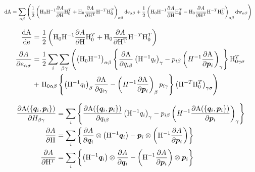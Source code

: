 \documentclass[11pt,a4paper,uplatex]{jsarticle}
\begin{document}
\begin{align}
    {\rm dA} &= \sum_{\alpha \beta} \left( 
    \frac{1}{2}\left({\rm H}_{0} {\rm H}^{-1} \frac{\partial A}{\partial {\rm H}} {\rm H}_{0}^{T} + {\rm H}_{0} \frac{\partial A}{\partial {\rm H^{T}}} {\rm H}^{-T}{\rm H}_{0}^{T}  \right)_{\alpha \beta} {\rm de}_{\alpha \beta}
     + \frac{1}{2}\left({\rm H}_{0} {\rm H}^{-1} \frac{\partial A}{\partial {\rm H}} {\rm H}_{0}^{T} - {\rm H}_{0} \frac{\partial A}{\partial {\rm H^{T}}} {\rm H}^{-T}{\rm H}_{0}^{T}  \right)_{\alpha \beta} {\rm dw}_{\alpha \beta} 
     \right)
\end{align}

\begin{align}
    \frac{\rm dA}{\rm de} &= \frac{1}{2}\left({\rm H}_{0} {\rm H}^{-1} \frac{\partial A}{\partial {\rm H}} {\rm H}_{0}^{T} + {\rm H}_{0} \frac{\partial A}{\partial {\rm H^{T}}} {\rm H}^{-T}{\rm H}_{0}^{T}  \right) \\
    \frac{\partial A}{\partial e_{\alpha \sigma}} &= \frac{1}{2} \sum_{i} \sum_{\beta \gamma} \left( \left({\rm H}_{0} {\rm H}^{-1}\right)_{\alpha \beta}
     \left\{ \frac{\partial {\rm A}}{\partial q_{i \beta}} \left({\rm H}^{-1} q_{i}\right)_{\gamma}    -  p_{i \beta} \left( H^{-1} \frac{\partial {\rm A}}{\partial \bm{p}_{i}}  \right)_{\gamma} \right\} {\rm H}_{0 \gamma \sigma} ^{T}\right. \\
    &+ \left. {\rm H}_{0 \alpha \beta}  \left\{ \left({\rm H}^{-1} q_{i}\right)_{\beta} \frac{\partial {\rm A}}{\partial q_{i \gamma}}  -  \left( H^{-1} \frac{\partial {\rm A}}{\partial \bm{p}_{i}}  \right)_{\beta} p_{i \gamma} \right\}   \left({\rm H}^{-T}{\rm H}_{0}^{T} \right)_{\gamma \sigma} \right) \\
\end{align}

\begin{align}
    \frac{\partial {\rm A}(\{\bm{q}_{i}, \bm{p}_{i}\})}{\partial H_{\beta \gamma}} 
    &= \sum_{i} \left\{ \frac{\partial {\rm A}(\{\bm{q}_{i}, \bm{p}_{i}\})}{\partial q_{i \beta}} \left({\rm H}^{-1} q_{i}\right)_{\gamma}
    -  p_{i \beta} \left( H^{-1} \frac{\partial {\rm A}(\{\bm{q}_{i}, \bm{p}_{i}\})}{\partial \bm{p}_{i}}  \right)_{\gamma} \right\} \\
    \frac{\partial A}{\partial {\rm H}} &= \sum_{i} \left\{ 
    \frac{\partial A }{\partial \bm{q}_{i}} \otimes \left({\rm H}^{-1} \bm{q}_{i} \right) 
   - \bm{p}_{i} \otimes \left( {\rm H}^{-1} \frac{\partial A }{\partial \bm{p}_{i}} \right)
    \right\}\\
    \frac{\partial A}{\partial {\rm H}^T} &= \sum_{i} \left\{\left({\rm H}^{-1} \bm{q}_{i} \right)  \otimes \frac{\partial A }{\partial \bm{q}_{i}} 
    - \left( {\rm H}^{-1} \frac{\partial A }{\partial \bm{p}_{i}} \right)\otimes \bm{p}_{i} 
    \right\}
\end{align}
\end{document}
